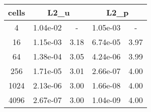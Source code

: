 \documentclass[10pt]{report}
\begin{document}
\begin{table}[H]
\begin{center}
\begin{tabular}{|c|c|c|c|c|} \hline
cells & 
\multicolumn{2}{|c|}{L2_u} & 
\multicolumn{2}{|c|}{L2_p}\\ \hline
4 & 1.04e-02 & - & 1.05e-03 & -\\ \hline
16 & 1.15e-03 & 3.18 & 6.74e-05 & 3.97\\ \hline
64 & 1.38e-04 & 3.05 & 4.24e-06 & 3.99\\ \hline
256 & 1.71e-05 & 3.01 & 2.66e-07 & 4.00\\ \hline
1024 & 2.13e-06 & 3.00 & 1.66e-08 & 4.00\\ \hline
4096 & 2.67e-07 & 3.00 & 1.04e-09 & 4.00\\ \hline
\end{tabular}
\end{center}
\end{table}
\end{document}
